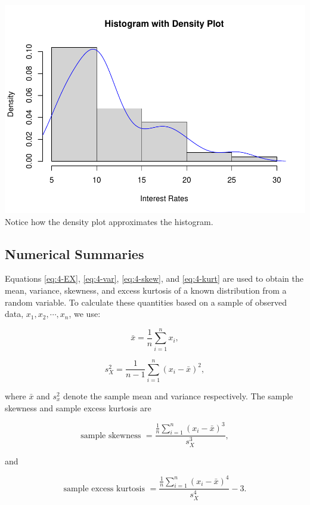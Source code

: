 \documentclass[
]{book}
\begin{document}
\includegraphics{bookdown-demo_files/figure-latex/4-R3-1.pdf}
Notice how the density plot approximates the histogram.

\hypertarget{numerical-summaries}{%
\subsection{Numerical Summaries}\label{numerical-summaries}}

Equations \eqref{eq:4-EX}, \eqref{eq:4-var}, \eqref{eq:4-skew}, and \eqref{eq:4-kurt} are used to obtain the mean, variance, skewness, and excess kurtosis of a known distribution from a random variable. To calculate these quantities based on a sample of observed data, \(x_1, x_2, \cdots, x_n\), we use:

\begin{equation} 
\bar{x} =  \frac{1}{n} \sum_{i=1}^n x_i,
\label{eq:4-xbar}
\end{equation}

\begin{equation} 
s_X^2 =  \frac{1}{n-1} \sum_{i=1}^n (x_i - \bar{x})^2,
\label{eq:4-sampvar}
\end{equation}

where \(\bar{x}\) and \(s_x^2\) denote the sample mean and variance respectively. The sample skewness and sample excess kurtosis are

\begin{equation} 
\text{sample skewness } =  \frac{\frac{1}{n} \sum_{i=1}^n (x_i - \bar{x})^3}{s_X^3},
\label{eq:4-sampskew}
\end{equation}

and

\begin{equation} 
\text{sample excess kurtosis } =  \frac{\frac{1}{n} \sum_{i=1}^n (x_i - \bar{x})^4}{s_X^4} - 3.
\label{eq:4-sampkurt}
\end{equation}
\end{document}

